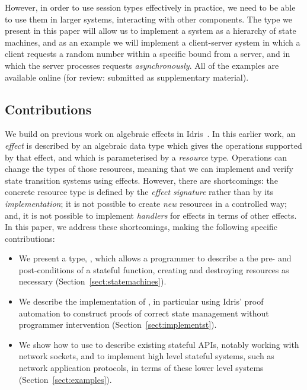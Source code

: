 However, in order to use session types effectively in practice, we need to be
able to use them in larger systems, interacting with other components. The
\states{} type we present in this paper will allow us to implement a system as
a hierarchy of state machines, and as an example we will implement a
client-server system in which a client requests a random number within a
specific bound from a server, and in which the server processes requests
\emph{asynchronously}. All of the examples are available
online (for review: submitted as supplementary material).

\subsection{Contributions}

We build on previous work on algebraic effects in
Idris~\citep{brady-eff2013,brady-tfp14}. 
In this earlier work, an \emph{effect} is described by an algebraic data
type which gives the operations supported by that effect, and which
is parameterised by a \emph{resource} type.
Operations can change the types of those resources, meaning
that we can implement and verify state transition systems using effects.
However, there are shortcomings: the concrete resource type is defined by the
\emph{effect signature} rather than by its \emph{implementation}; 
it is not possible to create \emph{new} resources in a
controlled way; and, it is not possible to implement \emph{handlers} for
effects in terms of other effects.
%
In this paper, we address these shortcomings, making the following
specific contributions:

\begin{itemize}
\item We present a type, \states{}, which allows a programmer to 
describe a the pre- and post-conditions of a stateful function, creating
and destroying resources as necessary (Section~\ref{sect:statemachines}).
\item We describe the implementation of \states{}, in particular using
Idris' proof automation to construct proofs of correct state management
without programmer intervention (Section~\ref{sect:implementst}).
\item We show how to use \states{} to describe existing stateful APIs,
notably working with network sockets, and to implement high level stateful
systems, such as network application protocols, in terms of these lower level
systems (Section~\ref{sect:examples}).
\end{itemize}

